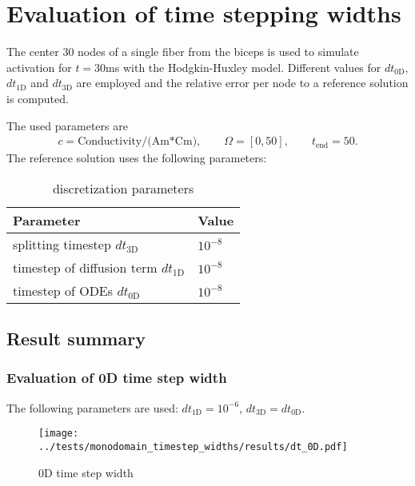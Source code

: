 %
\clearpage
%
\section{Evaluation of time stepping widths}
%
 The center 30 nodes of a single fiber from the biceps is used to simulate activation for $t=30$ms with the Hodgkin-Huxley model.
 Different values for $dt_\text{0D}$, $dt_\text{1D}$ and $dt_\text{3D}$ are employed and the relative error per node to a reference solution is computed.

The used parameters are
\begin{equation*}
  \begin{array}{lll}
    c = \text{Conductivity/(Am*Cm)},\qquad \Omega = [0,50], \qquad t_\text{end}=50.
  \end{array}
\end{equation*}
The reference solution uses the following parameters:
\begin{table}[h!]
  \begin{center}
    \begin{tabular}{l|l}
      \textbf{Parameter} & \textbf{Value}\\
      \hline
      splitting timestep $dt_\text{3D}$ & $10^{-8}$\\
      timestep of diffusion term $dt_\text{1D}$ & $10^{-8}$\\
      timestep of ODEs $dt_\text{0D}$ & $10^{-8}$
    \end{tabular}
  \end{center}
  \caption{discretization parameters}
  \label{tab:table_monodomain2}
\end{table}
  
\subsection{Result summary}

\subsubsection{Evaluation of 0D time step width}
\vspace*{-0.2cm}
The following parameters are used: $dt_\text{1D}= 10^{-6}$, $dt_\text{3D} = dt_\text{0D}$.
\begin{figure}[h!]
  \centering%
  \texttt{[image: ../tests/monodomain\_timestep\_widths/results/dt\_0D.pdf]}%
  \caption{0D time step width}
\end{figure} 

